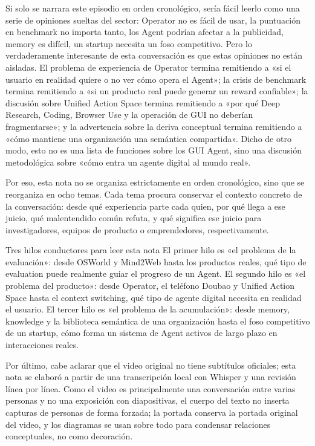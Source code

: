\documentclass[a4paper]{article}
\begin{document}
Si solo se narrara este episodio en orden cronológico, sería fácil leerlo como una serie de opiniones sueltas del sector: Operator no es fácil de usar, la puntuación en benchmark no importa tanto, los Agent podrían afectar a la publicidad, memory es difícil, un startup necesita un foso competitivo. Pero lo verdaderamente interesante de esta conversación es que estas opiniones no están aisladas. El problema de experiencia de Operator termina remitiendo a «si el usuario en realidad quiere o no ver cómo opera el Agent»; la crisis de benchmark termina remitiendo a «si un producto real puede generar un reward confiable»; la discusión sobre Unified Action Space termina remitiendo a «por qué Deep Research, Coding, Browser Use y la operación de GUI no deberían fragmentarse»; y la advertencia sobre la deriva conceptual termina remitiendo a «cómo mantiene una organización una semántica compartida». Dicho de otro modo, esto no es una lista de funciones sobre los GUI Agent, sino una discusión metodológica sobre «cómo entra un agente digital al mundo real».

Por eso, esta nota no se organiza estrictamente en orden cronológico, sino que se reorganiza en ocho temas. Cada tema procura conservar el contexto concreto de la conversación: desde qué experiencia parte cada quien, por qué llega a ese juicio, qué malentendido común refuta, y qué significa ese juicio para investigadores, equipos de producto o emprendedores, respectivamente.

\begin{importantbox}{Tres hilos conductores para leer esta nota}
El primer hilo es «el problema de la evaluación»: desde OSWorld y Mind2Web hasta los productos reales, qué tipo de evaluation puede realmente guiar el progreso de un Agent. El segundo hilo es «el problema del producto»: desde Operator, el teléfono Doubao y Unified Action Space hasta el context switching, qué tipo de agente digital necesita en realidad el usuario. El tercer hilo es «el problema de la acumulación»: desde memory, knowledge y la biblioteca semántica de una organización hasta el foso competitivo de un startup, cómo forma un sistema de Agent activos de largo plazo en interacciones reales.
\end{importantbox}

Por último, cabe aclarar que el video original no tiene subtítulos oficiales; esta nota se elaboró a partir de una transcripción local con Whisper y una revisión línea por línea. Como el video es principalmente una conversación entre varias personas y no una exposición con diapositivas, el cuerpo del texto no inserta capturas de personas de forma forzada; la portada conserva la portada original del video, y los diagramas se usan sobre todo para condensar relaciones conceptuales, no como decoración.
\end{document}
